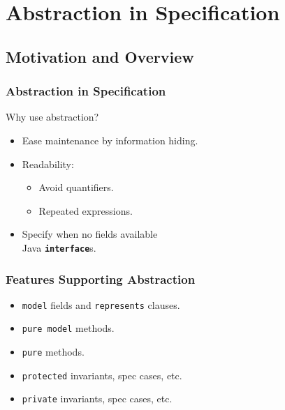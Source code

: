 
\section[Abstr.]{Abstraction in Specification}

\subsection[Motivation]{Motivation and Overview}

\begin{frame}
\frametitle{Abstraction in Specification}

Why use abstraction?
\begin{itemize}
\item
Ease maintenance by information hiding.

\item
Readability:
\begin{itemize}
\item
Avoid quantifiers.

\item
Repeated expressions.
\end{itemize}

\item
Specify when no fields available \\
Java \textbf{\texttt{interface}}s.
\end{itemize}
\end{frame}

\begin{frame}[fragile]
\frametitle{Features Supporting Abstraction}

\begin{itemize}
\item
\lstinline!model! fields and \lstinline!represents! clauses.

\item
\lstinline!pure model! methods.

\item
\lstinline!pure! methods.

\item
\lstinline!protected! invariants, spec cases, etc.

\item
\lstinline!private! invariants, spec cases, etc.
\end{itemize}
\end{frame}


